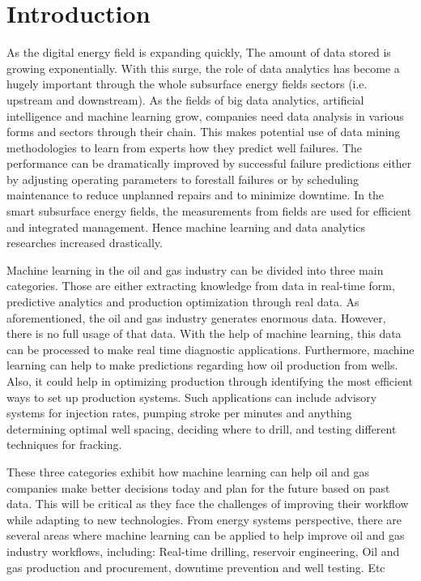 \chapter{Introduction}

As the digital energy field is expanding quickly, The amount of data stored is growing exponentially. With this surge, the role of data analytics has become a hugely important through the whole subsurface energy fields sectors (i.e. upstream and downstream). As the fields of big data analytics, artificial intelligence and machine learning grow, companies need data analysis in various forms and sectors through their chain. This makes potential use of data mining methodologies to learn from experts how they predict well failures. The performance can be dramatically improved by successful failure predictions either by adjusting operating parameters to forestall failures or by scheduling maintenance to reduce unplanned repairs and to minimize downtime. In the smart subsurface energy fields, the measurements from fields are used for efficient and integrated management. Hence machine learning and data analytics researches increased drastically.

Machine learning in the oil and gas industry can be divided into three main categories. Those are either extracting knowledge from data in real-time form, predictive analytics and production optimization through real data. As aforementioned, the oil and gas industry generates enormous data. However, there is no full usage of that data. With the help of machine learning, this data can be processed to make real time diagnostic applications. Furthermore, machine learning can help to make predictions regarding how oil production from wells. Also, it could help in optimizing production through identifying the most efficient ways to set up production systems. Such applications can include advisory systems for injection rates, pumping stroke per minutes and anything determining optimal well spacing, deciding where to drill, and testing different techniques for fracking.

These three categories exhibit how machine learning can help oil and gas companies make better decisions today and plan for the future based on past data. This will be critical as they face the challenges of improving their workflow while adapting to new technologies. From energy systems perspective, there are several areas where machine learning can be applied to help improve oil and gas industry workflows, including: Real-time drilling, reservoir engineering, Oil and gas production and procurement, downtime prevention and well testing. Etc

